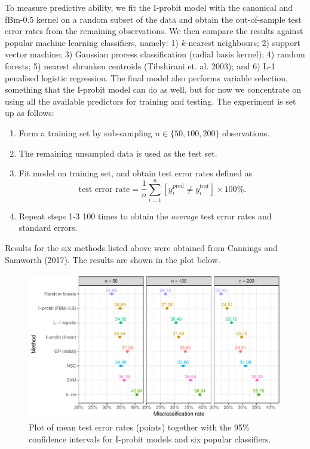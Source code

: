 \documentclass[a4paper,showframe,11pt]{report}\usepackage[]{graphicx}\usepackage[]{color}
\makeatletter
\def\maxwidth{ %
  \ifdim\Gin@nat@width>\linewidth
    \linewidth
  \else
    \Gin@nat@width
  \fi
}
\newenvironment{knitrout}{}{} %
\makeatother
\begin{document}
To measure predictive ability, we fit the I-probit model with the canonical and fBm-0.5 kernel on a random subset of the data and obtain the out-of-sample test error rates from the remaining observations. We then compare the results against popular machine learning classifiers, namely: 1) $k$-nearest neighbours; 2) support vector machine; 3) Gaussian process classification (radial basis kernel); 4) random forests; 5) nearest shrunken centroids (Tibshirani et. al. 2003); and 6) L-1 penalised logistic regression. The final model also performs variable selection, something that the I-probit model can do as well, but for now we concentrate on using all the available predictors for training and testing. The experiment is set up as follows:
\begin{enumerate}
  \item Form a training set by sub-sampling $n \in \{50, 100, 200\}$ observations.
  \item The remaining unsampled data is used as the test set.
  \item Fit model on training set, and obtain test error rates defined as
  \[
    \text{test error rate} = \frac{1}{n} \sum_{i=1}^n [y^{\text{pred}}_i \neq y^{\text{test}}_i] \times 100 \%.
  \]
  \item Repeat steps 1-3 100 times to obtain the \emph{average} test error rates and standard errors.
\end{enumerate}
Results for the six methods listed above were obtained from Cannings and Samworth (2017). The results are shown in the plot below.


\begin{knitrout}
\color{fgcolor}\begin{figure}

{\centering \includegraphics[width=\maxwidth]{figure/plot_cardiac-1} 

}

\caption[Plot of mean test error rates (points) together with the 95\% confidence intervals for I-probit models and six popular classifiers]{Plot of mean test error rates (points) together with the 95\% confidence intervals for I-probit models and six popular classifiers.}\label{fig:plot_cardiac}
\end{figure}


\end{knitrout}
\end{document}
